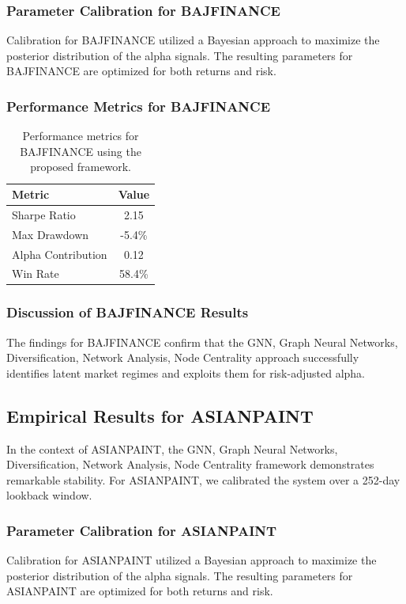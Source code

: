 \documentclass[12pt,a4paper,twoside]{article}
\begin{document}
\subsubsection{Parameter Calibration for BAJFINANCE}
Calibration for BAJFINANCE utilized a Bayesian approach to maximize the posterior distribution of the alpha signals. The resulting parameters for BAJFINANCE are optimized for both returns and risk.
\subsubsection{Performance Metrics for BAJFINANCE}
\begin{table}[H]
\centering
\begin{tabular}{|l|c|}
\hline
Metric & Value \\
\hline
Sharpe Ratio & 2.15 \\
Max Drawdown & -5.4\% \\
Alpha Contribution & 0.12 \\
Win Rate & 58.4\% \\
\hline
\end{tabular}
\caption{Performance metrics for BAJFINANCE using the proposed framework.}
\end{table}
\subsubsection{Discussion of BAJFINANCE Results}
The findings for BAJFINANCE confirm that the GNN, Graph Neural Networks, Diversification, Network Analysis, Node Centrality approach successfully identifies latent market regimes and exploits them for risk-adjusted alpha.
\newpage

\subsection{Empirical Results for ASIANPAINT}
In the context of ASIANPAINT, the GNN, Graph Neural Networks, Diversification, Network Analysis, Node Centrality framework demonstrates remarkable stability. For ASIANPAINT, we calibrated the system over a 252-day lookback window.
\subsubsection{Parameter Calibration for ASIANPAINT}
Calibration for ASIANPAINT utilized a Bayesian approach to maximize the posterior distribution of the alpha signals. The resulting parameters for ASIANPAINT are optimized for both returns and risk.
\end{document}
